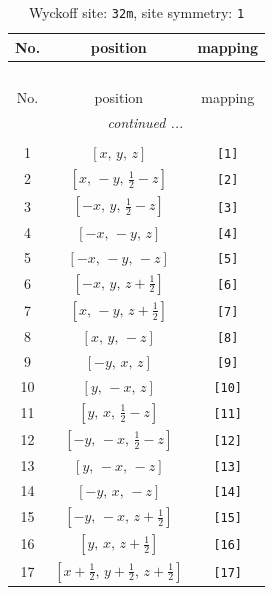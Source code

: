 \documentclass[fleqn,8pt]{jsarticle}
\begin{document}
\renewcommand{\arraystretch}{1.2}
\begin{longtable}{ccc}
\caption{Wyckoff site: {\tt 32m}, site symmetry: {\tt 1}}
 \\
 \hline \hline
No. & position & mapping \\ \hline \endfirsthead

\multicolumn{2}{l}{\tablename\ \thetable{}} \\
 \hline \hline
No. & position & mapping \\ \hline \endhead

 \hline \hline
\multicolumn{2}{r}{\footnotesize\it continued ...} \\ \endfoot

 \hline \hline
\multicolumn{2}{r}{} \\ \endlastfoot

1 & $\left[ x,\, y,\, z \right]$ & {\tt [1]} \\ \hline
2 & $\left[ x,\, - y,\, \frac{1}{2} - z \right]$ & {\tt [2]} \\ \hline
3 & $\left[ - x,\, y,\, \frac{1}{2} - z \right]$ & {\tt [3]} \\ \hline
4 & $\left[ - x,\, - y,\, z \right]$ & {\tt [4]} \\ \hline
5 & $\left[ - x,\, - y,\, - z \right]$ & {\tt [5]} \\ \hline
6 & $\left[ - x,\, y,\, z + \frac{1}{2} \right]$ & {\tt [6]} \\ \hline
7 & $\left[ x,\, - y,\, z + \frac{1}{2} \right]$ & {\tt [7]} \\ \hline
8 & $\left[ x,\, y,\, - z \right]$ & {\tt [8]} \\ \hline
9 & $\left[ - y,\, x,\, z \right]$ & {\tt [9]} \\ \hline
10 & $\left[ y,\, - x,\, z \right]$ & {\tt [10]} \\ \hline
11 & $\left[ y,\, x,\, \frac{1}{2} - z \right]$ & {\tt [11]} \\ \hline
12 & $\left[ - y,\, - x,\, \frac{1}{2} - z \right]$ & {\tt [12]} \\ \hline
13 & $\left[ y,\, - x,\, - z \right]$ & {\tt [13]} \\ \hline
14 & $\left[ - y,\, x,\, - z \right]$ & {\tt [14]} \\ \hline
15 & $\left[ - y,\, - x,\, z + \frac{1}{2} \right]$ & {\tt [15]} \\ \hline
16 & $\left[ y,\, x,\, z + \frac{1}{2} \right]$ & {\tt [16]} \\ \hline
17 & $\left[ x + \frac{1}{2},\, y + \frac{1}{2},\, z + \frac{1}{2} \right]$ & {\tt [17]} \\ \hline

\end{longtable}
\end{document}
